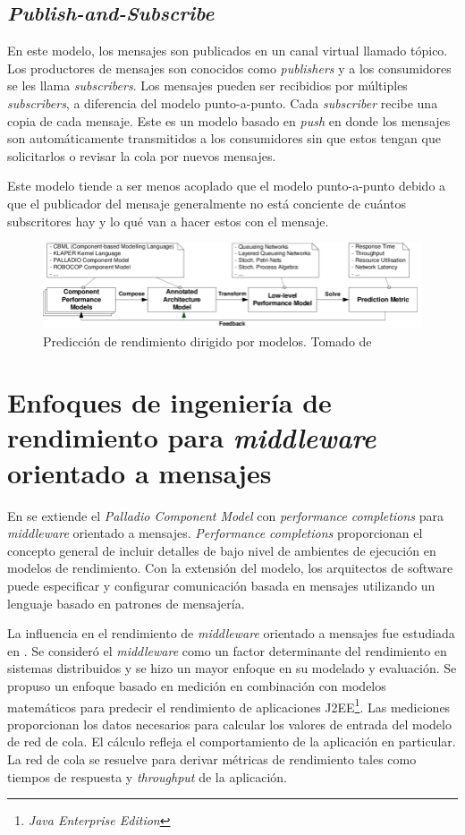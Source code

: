 \documentclass[11pt, twoside]{report}
\begin{document}
\subsection{\emph{Publish-and-Subscribe}}
En este modelo, los mensajes son publicados en un canal virtual llamado tópico. Los productores de mensajes son conocidos como \emph{publishers} y a los consumidores se les llama \emph{subscribers}. Los mensajes pueden ser recibidios por múltiples \emph{subscribers}, a diferencia del modelo punto-a-punto. Cada \emph{subscriber} recibe una copia de cada mensaje. Este es un modelo basado en \emph{push} en donde los mensajes son automáticamente transmitidos a los consumidores sin que estos tengan que solicitarlos o revisar la cola por nuevos mensajes. 

Este modelo tiende a ser menos acoplado que el modelo punto-a-punto debido a que el publicador del mensaje generalmente no está conciente de cuántos subscritores hay y lo qué van a hacer estos con el mensaje.


\begin{figure}[h]
  \centering
  \includegraphics[width=15cm]{model-driven-performance-prediction}
  \caption{\small{Predicción de rendimiento dirigido por modelos. Tomado de \cite{happe-et-al}}}
  \label{fig:model-driven-performance-prediction}
\end{figure}


\section{Enfoques de ingeniería de rendimiento para \emph{middleware} orientado a mensajes}
En \cite{happe-et-al} se extiende el \emph{Palladio Component Model} con \emph{performance completions} para \emph{middleware} orientado a mensajes. \emph{Performance completions}\cite{woodside-et-al-2} proporcionan el concepto general de incluir detalles de bajo nivel de ambientes de ejecución en modelos de rendimiento. Con la extensión del modelo, los arquitectos de software puede especificar y configurar comunicación basada en mensajes utilizando un lenguaje basado en patrones de mensajería.

La influencia en el rendimiento de \emph{middleware} orientado a mensajes fue estudiada en \cite{liu-gordon}. Se consideró el \emph{middleware} como un factor determinante del rendimiento en sistemas distribuidos y se hizo un mayor enfoque en su modelado y evaluación. Se propuso un enfoque basado en medición en combinación con modelos matemáticos para predecir el rendimiento de aplicaciones J2EE\footnote{\emph{Java Enterprise Edition}}. Las mediciones proporcionan los datos necesarios para calcular los valores de entrada del modelo de red de cola. El cálculo refleja el comportamiento de la aplicación en particular. La red de cola se resuelve para derivar métricas de rendimiento tales como tiempos de respuesta y \emph{throughput} de la aplicación. 
\end{document}
